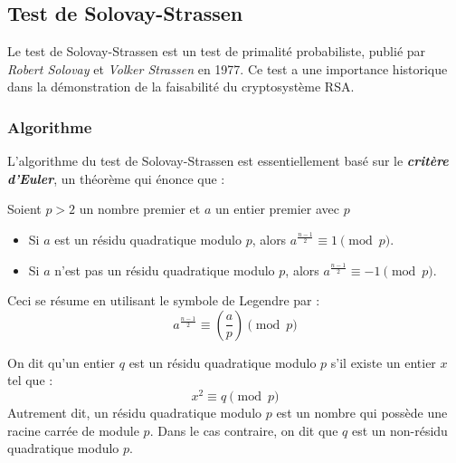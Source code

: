 \subsection{Test de Solovay-Strassen}

	Le test de Solovay-Strassen est un test de primalité probabiliste, publié par \textit{Robert Solovay} et \textit{Volker Strassen} en 1977. Ce test a une importance historique dans la démonstration de la faisabilité du cryptosystème RSA.

	\subsubsection{Algorithme}
		L'algorithme du test de Solovay-Strassen est essentiellement basé sur le \textit{\textbf{critère d'Euler}}, un théorème qui énonce que :
		\vspace{-1.5em}\begin{adjustwidth}{1.5cm}{1.5cm} 
		\begin{Th}
			\label{CritereEuler}
			Soient $p > 2$ un nombre premier et $a$ un entier premier avec $p$
			\begin{itemize}
				\item Si $a$ est un résidu quadratique modulo $p$, alors $a^{\frac{n-1}{2}} \equiv 1 \pmod p$.
				\item Si $a$ n'est pas un résidu quadratique modulo $p$, alors $a^{\frac{n-1}{2}} \equiv -1 \pmod p$.
			\end{itemize}
			Ceci se résume en utilisant le symbole de Legendre par :
			\[a^{\frac{n-1}{2}} \equiv \left ( \frac{a}{p} \right ) \pmod p\]
		\end{Th}
		\end{adjustwidth}\vspace{0.5em}
		
		\vspace{-1.5em}\begin{adjustwidth}{1.5cm}{1.5cm} 
		\begin{Def}
			\label{Residu}
			On dit qu'un entier $q$ est un résidu quadratique modulo $p$ s'il existe un entier $x$ tel que :
			\[x^{2} \equiv q \pmod p\]
			Autrement dit, un résidu quadratique modulo $p$ est un nombre qui possède une racine carrée de module $p$. Dans le cas contraire, on dit que $q$ est un non-résidu quadratique modulo $p$.
		\end{Def}
		\end{adjustwidth}\vspace{0.5em}
		
